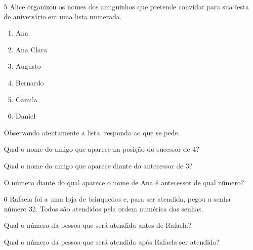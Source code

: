 \num{5} Alice organizou os nomes dos amiguinhos que pretende convidar para sua
festa de aniversário em uma lista numerada.

\begin{enumerate}
\item Ana

\item Ana Clara

\item Augusto

\item Bernardo

\item Camila

\item Daniel
\end{enumerate}

Observando atentamente a lista. responda ao que se pede.

\begin{escolha}
\item Qual o nome do amigo que aparece na posição do sucessor de 4?


\item Qual o nome do amigo que aparece diante do antecessor de 3?


\item O número diante do qual aparece o nome de Ana é antecessor de qual número?

\end{escolha}

\num{6} Rafaela foi a uma loja de brinquedos e, para ser atendida, pegou a senha
número 32. Todos são atendidos pela ordem numérica das senhas.


\begin{escolha}
\item Qual o número da pessoa que será atendida antes de Rafaela?


\item Qual o número da pessoa que será atendida após Rafaela ser atendida?

\end{escolha}


